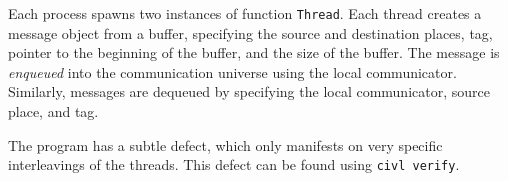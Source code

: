 Each process spawns two instances of function \texttt{Thread}.  Each
thread creates a message object from a buffer, specifying the source
and destination places, tag, pointer to the beginning of the buffer,
and the size of the buffer.  The message is \emph{enqueued} into the
communication universe using the local communicator.  Similarly,
messages are dequeued by specifying the local communicator, source
place, and tag.

The program has a subtle defect, which only manifests on very specific
interleavings of the threads.   This defect can be found using
\texttt{civl verify}.


